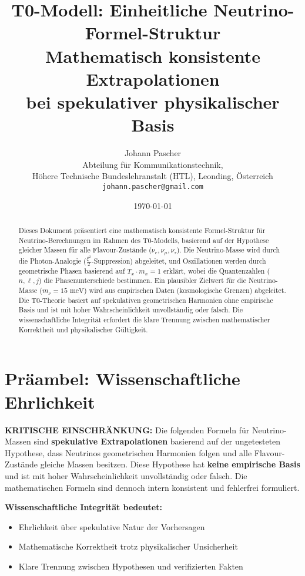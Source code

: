 \documentclass[12pt,a4paper]{article}
\title{\Huge\textbf{T0-Modell: Einheitliche Neutrino-Formel-Struktur}\\
	\Large Mathematisch konsistente Extrapolationen \\
	bei spekulativer physikalischer Basis}
\author{Johann Pascher\\
	Abteilung für Kommunikationstechnik, \\
	Höhere Technische Bundeslehranstalt (HTL), Leonding, Österreich\\
	\texttt{johann.pascher@gmail.com}}
\date{\today}
\newcommand{\xipar}{\xi}
\begin{document}
	
	\maketitle
	
	\begin{abstract}
		Dieses Dokument präsentiert eine mathematisch konsistente Formel-Struktur für Neutrino-Berechnungen im Rahmen des T0-Modells, basierend auf der Hypothese gleicher Massen für alle Flavour-Zustände (\(\nu_e, \nu_\mu, \nu_\tau\)). Die Neutrino-Masse wird durch die Photon-Analogie (\(\frac{\xipar^2}{2}\)-Suppression) abgeleitet, und Oszillationen werden durch geometrische Phasen basierend auf \( T_x \cdot m_x = 1 \) erklärt, wobei die Quantenzahlen (\(n, \ell, j\)) die Phasenunterschiede bestimmen. Ein plausibler Zielwert für die Neutrino-Masse (\(m_\nu = 15 \text{ meV}\)) wird aus empirischen Daten (kosmologische Grenzen) abgeleitet. Die T0-Theorie basiert auf spekulativen geometrischen Harmonien ohne empirische Basis und ist mit hoher Wahrscheinlichkeit unvollständig oder falsch. Die wissenschaftliche Integrität erfordert die klare Trennung zwischen mathematischer Korrektheit und physikalischer Gültigkeit.
	\end{abstract}
	
	\tableofcontents
	\newpage
	
	\section{Präambel: Wissenschaftliche Ehrlichkeit}
	
	\begin{warning}
		\textbf{KRITISCHE EINSCHRÄNKUNG:} Die folgenden Formeln für Neutrino-Massen sind \textbf{spekulative Extrapolationen} basierend auf der ungetesteten Hypothese, dass Neutrinos geometrischen Harmonien folgen und alle Flavour-Zustände gleiche Massen besitzen. Diese Hypothese hat \textbf{keine empirische Basis} und ist mit hoher Wahrscheinlichkeit unvollständig oder falsch. Die mathematischen Formeln sind dennoch intern konsistent und fehlerfrei formuliert.
		
		\vspace{0.5cm}
		\textbf{Wissenschaftliche Integrität bedeutet:}
		\begin{itemize}
			\item Ehrlichkeit über spekulative Natur der Vorhersagen
			\item Mathematische Korrektheit trotz physikalischer Unsicherheit
			\item Klare Trennung zwischen Hypothesen und verifizierten Fakten
		\end{itemize}
	\end{warning}
	
\end{document}
